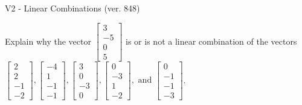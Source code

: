 \begin{exercise}
  \begin{exerciseTitle}V2 - Linear Combinations (ver. 848)\end{exerciseTitle}
  \begin{exerciseStatement}
    Explain why the vector \(\left[\begin{array}{c}
3 \\
-5 \\
0 \\
5
\end{array}\right]\)  is or is not a linear 
	combination of the vectors \(\left[\begin{array}{c}
2 \\
2 \\
-1 \\
-2
\end{array}\right] , \left[\begin{array}{c}
-4 \\
1 \\
-1 \\
-1
\end{array}\right] , \left[\begin{array}{c}
3 \\
0 \\
-3 \\
0
\end{array}\right] , \left[\begin{array}{c}
0 \\
-3 \\
1 \\
-2
\end{array}\right] , \text{ and } \left[\begin{array}{c}
0 \\
-1 \\
-1 \\
-3
\end{array}\right]\).
	



\end{exerciseStatement}
\end{exercise}
